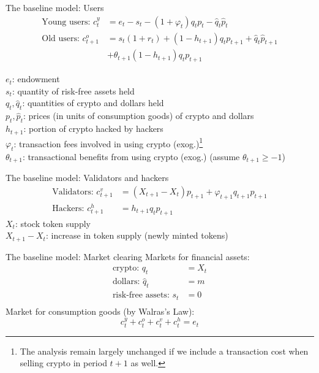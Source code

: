 \documentclass{beamer}
\begin{document}
\begin{frame}{The baseline model: Users}
\label{formal}
\begin{align}
    \text{Young users: } c_t^y &= e_t- s_t - (1+\varphi_t) q_t p_t - \hat{q}_t \hat{p}_t\\
    \text{Old users: } c_{t+1}^o &= s_t (1+r_t) + (1-h_{t+1}) q_t p_{t+1} + \hat{q}_t \hat{p}_{t+1} \nonumber \\
    &+ \theta_{t+1} (1-h_{t+1}) q_t p_{t+1} 
\end{align}

$e_t$: endowment\\
$s_t$: quantity of risk-free assets held\\
$q_t, \hat{q}_t$: quantities of crypto and dollars held\\
$p_t, \hat{p}_t$: prices (in units of consumption goods) of crypto and dollars\\
$h_{t+1}$: portion of crypto hacked by hackers\\
$\varphi_t$: transaction fees involved in using crypto (exog.)\footnote{The analysis remain largely unchanged if we include a transaction cost when selling crypto in period $t+1$ as well.}\\
$\theta_{t+1}$: transactional benefits from using crypto (exog.) (assume $\theta_{t+1}\geq-1$) \\

\end{frame}


\begin{frame}{The baseline model: Validators and hackers}
\begin{align}
    \text{Validators: } c_{t+1}^v &= (X_{t+1} - X_t) p_{t+1} + \varphi_{t+1} q_{t+1} p_{t+1}\\
    \text{Hackers: } c_{t+1}^h &= h_{t+1} q_t p_{t+1}
\end{align}
$X_t$: stock token supply\\
$X_{t+1} - X_t$: increase in token supply (newly minted tokens)
\end{frame}

\begin{frame}{The baseline model: Market clearing}
Markets for financial assets:
\begin{align}
    \text{crypto: } q_t &= X_t \\
    \text{dollars: } \hat{q}_t &= m \\
    \text{risk-free assets: } s_t &= 0 \\
\end{align}
Market for consumption goods (by Walras's Law):
\begin{equation}
    c_t^y + c_t^o + c_t^v + c_t^h = e_t
\end{equation}

\end{frame}
\end{document}
